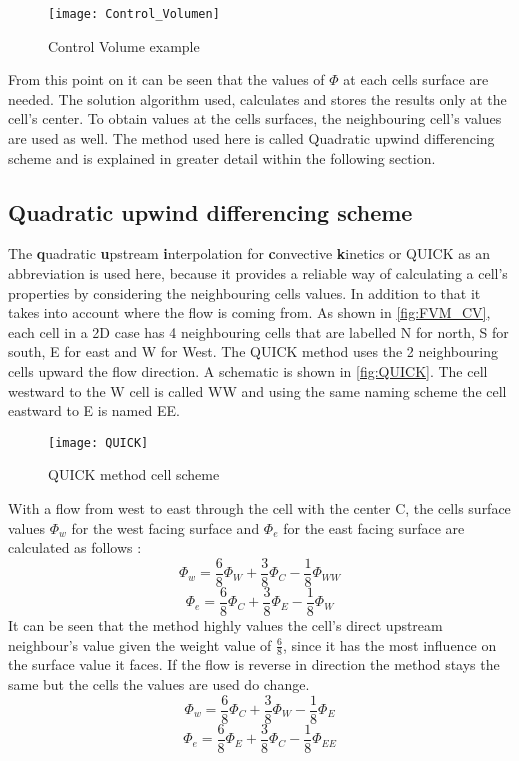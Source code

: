 \documentclass[../thesis.tex]{subfiles}
\begin{document}
\begin{figure}[htbp]
	\centering
	\texttt{[image: Control\_Volumen]}
	\caption{Control Volume example}
	\label{fig:FVM_CV}
\end{figure}

From this point on it can be seen that the values of $\Phi$ at each cells surface are needed. The solution algorithm used, calculates and stores the results only at the cell's center. To obtain values at the cells surfaces, the neighbouring cell's values are used as well. The method used here is called Quadratic upwind differencing scheme and is explained in greater detail within the following section.

\subsection{Quadratic upwind differencing scheme}
\label{sec:QUICK}
The \textbf{q}uadratic \textbf{u}pstream \textbf{i}nterpolation for \textbf{c}onvective \textbf{k}inetics \cite{versteeg2007introduction} or QUICK as an abbreviation is used here, because it provides a reliable way of calculating a cell's properties by considering the neighbouring cells values. In addition to that it takes into account where the flow is coming from.
As shown in \autoref{fig:FVM_CV}, each cell in a 2D case has 4 neighbouring cells that are labelled N for north, S for south, E for east and W for West. The QUICK method uses the 2 neighbouring cells upward the flow direction. A schematic is shown in \autoref{fig:QUICK}. The cell westward to the W cell is called WW and using the same naming scheme the cell eastward to E is named EE.
\begin{figure}[htbp]
	\centering
	\texttt{[image: QUICK]}
	\caption{QUICK method cell scheme}
	\label{fig:QUICK}
\end{figure}
With a flow from west to east through the cell with the center C, the cells surface values $\Phi_w$ for the west facing surface and $\Phi_e$ for the east facing surface are calculated as follows \cite{versteeg2007introduction}:
\begin{equation}
	\Phi_w = \dfrac{6}{8} \Phi_W + \dfrac{3}{8} \Phi_C - \dfrac{1}{8} \Phi_{WW}
\end{equation}
\begin{equation}
	\Phi_e = \dfrac{6}{8} \Phi_C + \dfrac{3}{8} \Phi_E - \dfrac{1}{8} \Phi_{W}
\end{equation}
It can be seen that the method highly values the cell's direct upstream neighbour's value given the weight value of $\frac{6}{8}$, since it has the most influence on the surface value it faces. If the flow is reverse in direction the method stays the same but the cells the values are used do change.
\begin{equation}
	\Phi_w = \dfrac{6}{8} \Phi_C + \dfrac{3}{8} \Phi_W - \dfrac{1}{8} \Phi_{E}
\end{equation}
\begin{equation}
	\Phi_e = \dfrac{6}{8} \Phi_E + \dfrac{3}{8} \Phi_C - \dfrac{1}{8} \Phi_{EE}
\end{equation}
\end{document}
